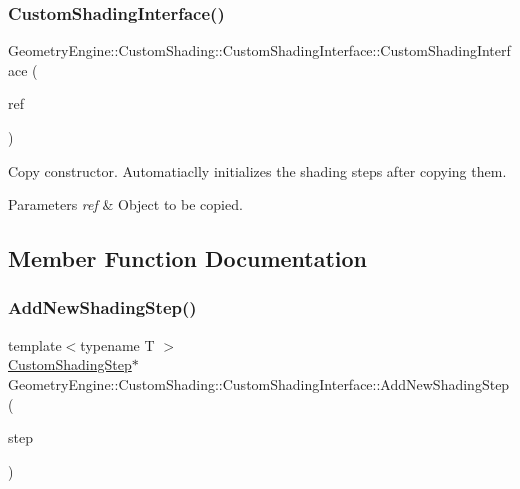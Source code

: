 \subsubsection{\texorpdfstring{CustomShadingInterface()}{CustomShadingInterface()}}
{\footnotesize\ttfamily Geometry\+Engine\+::\+Custom\+Shading\+::\+Custom\+Shading\+Interface\+::\+Custom\+Shading\+Interface (\begin{DoxyParamCaption}\item[{const \mbox{\hyperlink{class_geometry_engine_1_1_custom_shading_1_1_custom_shading_interface}{Custom\+Shading\+Interface}} \&}]{ref }\end{DoxyParamCaption})}

Copy constructor. Automatiaclly initializes the shading steps after copying them. 
\begin{DoxyParams}{Parameters}
{\em ref} & Object to be copied. \\
\hline
\end{DoxyParams}


\subsection{Member Function Documentation}
\mbox{\label{class_geometry_engine_1_1_custom_shading_1_1_custom_shading_interface_add17f0c72329bd4c36c5eca34b68007b}} 
\subsubsection{\texorpdfstring{AddNewShadingStep()}{AddNewShadingStep()}}
{\footnotesize\ttfamily template$<$typename T $>$ \\
\mbox{\hyperlink{class_geometry_engine_1_1_custom_shading_1_1_custom_shading_step}{Custom\+Shading\+Step}}$\ast$ Geometry\+Engine\+::\+Custom\+Shading\+::\+Custom\+Shading\+Interface\+::\+Add\+New\+Shading\+Step (\begin{DoxyParamCaption}\item[{\mbox{\hyperlink{namespace_geometry_engine_1_1_custom_shading_a2dc236a5b567da5099069ce2b2be5609}{Custom\+Shading\+Steps}}}]{step }\end{DoxyParamCaption})\hspace{0.3cm}{\ttfamily [inline]}}

